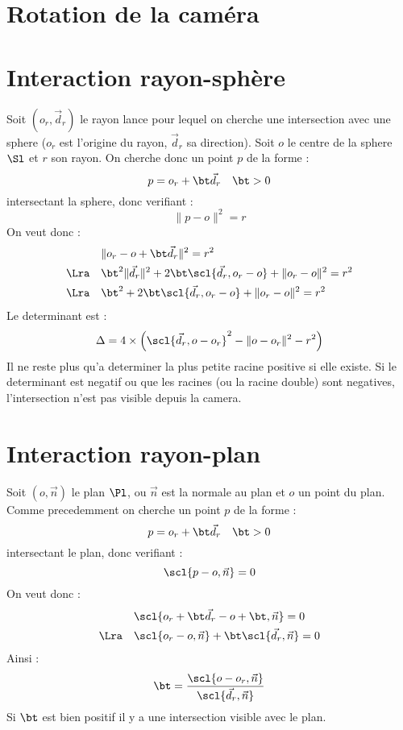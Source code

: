 \newpage\section{Rotation de la caméra}



\newpage\section{Interaction rayon-sphère}
\ni Soit $(o_r, \vec{d}_r)$ le rayon lance pour lequel on cherche une intersection
avec une sphere ($o_r$ est l'origine du rayon, $\vec{d}_r$ sa direction). Soit $o$ le
centre de la sphere $\Sl$ et $r$ son rayon. On cherche donc un point $p$ de la forme
:
$$p = o_r + \bt \vec{d}_r\quad \bt>0$$
\ni intersectant la sphere, donc verifiant :
$$\|p - o\|^2 = r$$
\ni On veut donc :
\begin{align*}
	&\|o_r - o + \bt \vec{d}_r\|^2=r^2\\
	\Lra\quad&\bt^2\|\vec{d}_r\|^2 + 2\bt\scl{\vec{d}_r, o_r - o} 
	+\|o_r - o\|^2 =r^2\\
	\Lra\quad&\bt^2 + 2\bt\scl{\vec{d}_r, o_r - o} +\|o_r - o\|^2 =r^2
\end{align*}
\ni Le determinant est :
$$\Delta = 4\times\left(\scl{\vec{d}_r, o - o_r}^2 - \|o - o_r\|^2 - 
r^2\right)$$
\ni Il ne reste plus qu'a determiner la plus petite racine positive si elle
existe. Si le determinant est negatif ou que les racines (ou la racine double)
sont negatives, l'intersection n'est pas visible depuis la camera.

\section{Interaction rayon-plan}
\ni Soit $(o,\vec{n})$ le plan $\Pl$, ou $\vec{n}$ est la normale au plan et $o$
un point du plan. Comme precedemment on cherche un point $p$ de la forme :
$$p = o_r + \bt \vec{d}_r\quad \bt>0$$
\ni intersectant le plan, donc verifiant :
$$\scl{p - o, \vec{n}} = 0$$
\ni On veut donc :
\begin{align*}
	&\scl{o_r + \bt \vec{d}_r - o + \bt, \vec{n}}=0\\
	\Lra\quad&\scl{o_r - o, \vec{n}} + \bt \scl{\vec{d}_r,\vec{n}}=0\\
\end{align*}
Ainsi :
$$\bt = \frac{\scl{o - o_r, \vec{n}}}{\scl{\vec{d}_r,\vec{n}}}$$
\ni Si $\bt$ est bien positif il y a une intersection visible avec le plan.

